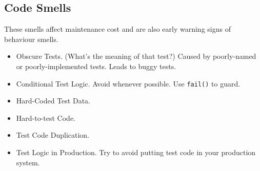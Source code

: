 \documentclass[11pt]{article}
\newenvironment{itemizep}{
 \begin{itemize}
  \setlength{\itemsep}{0pt}
  \setlength{\parsep}{3pt}
  \setlength{\topsep}{3pt}
  \setlength{\partopsep}{0pt}
  \setlength{\leftmargin}{1.5em}
  \setlength{\labelwidth}{1em}
  \setlength{\labelsep}{0.5em} }
 {\end{itemize}}
\begin{document}
\subsection*{Code Smells}
These smells affect maintenance cost and are also early warning signs of behaviour smells.
\begin{itemizep}
\item Obscure Tests. (What's the meaning of that test?) Caused by poorly-named or poorly-implemented tests.
Leads to buggy tests.
\item Conditional Test Logic. Avoid whenever possible. Use {\tt fail()} to guard.
\item Hard-Coded Test Data.
\item Hard-to-test Code.
\item Test Code Duplication.
\item Test Logic in Production. Try to avoid putting test code in your production system.
\end{itemizep}
\end{document}
